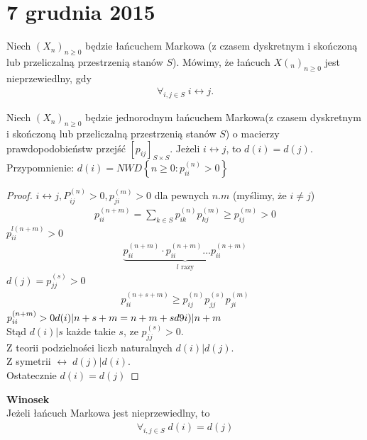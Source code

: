 \chapter{7 grudnia 2015}
\begin{defi}
Niech $ \left(X_n\right)_{n\ge 0} $ będzie łańcuchem Markowa (z czasem dyskretnym i skończoną lub przeliczalną przestrzenią stanów $ S $). Mówimy, że łańcuch $ X\left(_n\right)_{n\ge 0} $ jest nieprzewiedlny, gdy
\begin{gather*}
\forall_{i,j\in S}\;i\longleftrightarrow j.
\end{gather*}
\end{defi}
\begin{twr}
Niech $ \left(X_n\right)_{n\ge0} $ będzie jednorodnym łańcuchem Markowa(z czasem dyskretnym i skończoną lub przeliczalną przestrzenią stanów $ S $) o macierzy prawdopodobieństw przejść $ \left[p_{ij}\right]_{S\times S} $. Jeżeli $ i\longleftrightarrow j $, to $ d(i)=d(j) $.\\
Przypomnienie: $ d(i)=NWD\left\{n\ge0:p_{ii}^{(n)}>0\right\} $
\end{twr}
\begin{proof}
$ i\longleftrightarrow j,P_{ij}^{(n)}>0,p_{ji}^{(m)}>0 $ dla pewnych $ n.m $ (myślimy, że $ i\neq j $)
\begin{gather*}
p_{ii}^{(n+m)}=\sum_{k\in S}p_{ik}^{(n)}p_{kj}^{(m)}\ge p_{ij}^{(m)}>0
\end{gather*}
$ p_{ii}^{l(n+m)}>0 $
\begin{gather*}
\underbrace{p_{ii}^{(n+m)}\cdot p_{ii}^{(n+m)}\dots p_{ii}^{(n+m)}}_{l\text{ razy}}
\end{gather*}
$ d(j)=p_{jj}^{(s)}>0 $
\begin{gather*}
p_{ii}^{(n+s+m)}\ge p_{ij}^{(n)}p_{jj}^{(s)}p_{ji}^{(m)}
\end{gather*}
$ p_{ii}^{(n+m)}>0 \\
d(i)|n+s+m=n+m+s\\
d9i)|n+m$\\
Stąd $ d(i)|s $ każde takie $ s $, ze $ p_{jj}^{(s)}>0 $.\\
Z teorii podzielności liczb naturalnych $ d(i)|d(j) $.\\
Z symetrii $ \longleftrightarrow\; d(j)|d(i) $.\\
Ostatecznie $ d(i)=d(j) $
\end{proof}
\textbf{Winosek}\\
Jeżeli łańcuch Markowa jest nieprzewiedlny, to
\begin{gather*}
\forall_{i,j\in S}\; d(i)=d(j)
\end{gather*}
